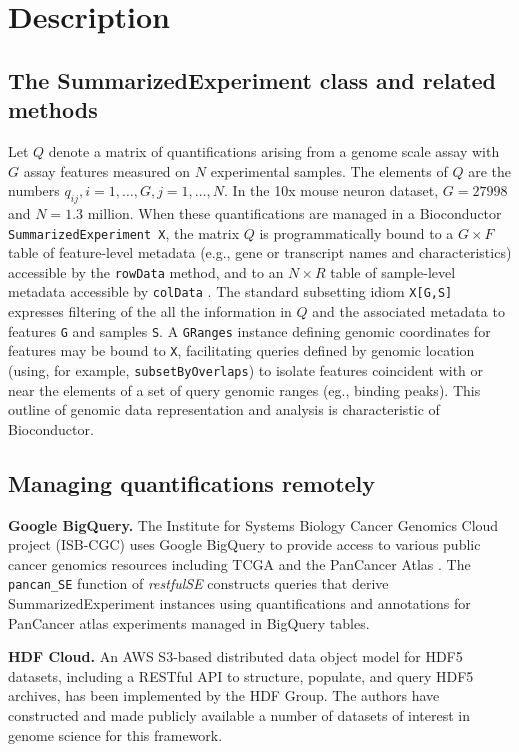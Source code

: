 \documentclass[applications]{gen-bioinformatics}
\newcommand{\Rpackage}[1]{{\textit{#1}}}
\begin{document}
\section*{Description}

\subsection*{The SummarizedExperiment class and related methods}

Let $Q$ denote a matrix of quantifications arising from a genome
scale assay with $G$ assay features measured on $N$ experimental
samples.  The elements of $Q$ are the numbers $q_{ij}, i = 1, \ldots, G,
j = 1, \ldots, N$.  In the 10x mouse neuron dataset, $G=27998$ and $N=1.3$ million.
When these quantifications are managed in a Bioconductor \verb+SummarizedExperiment X+, the matrix $Q$ is programmatically bound to a $G \times F$
table of feature-level metadata (e.g., gene or transcript names and
characteristics) accessible by the \verb+rowData+ method, and to an $N \times R$ table of sample-level metadata accessible by \verb+colData+ \citep{Huber2015}. 
The standard subsetting idiom \verb+X[G,S]+ expresses filtering of 
the all the information in $Q$ and the associated metadata
to features \verb+G+ and samples \verb+S+.  A \verb+GRanges+ 
instance \citep{Lawrence2013} defining genomic coordinates for features may be bound to \verb+X+,
facilitating queries defined by genomic location (using, for example, \verb+subsetByOverlaps+) to isolate features
coincident with or near the elements of a set of query genomic ranges (eg., binding peaks).  This outline of genomic data representation
and analysis is characteristic of Bioconductor.

\subsection*{Managing quantifications remotely}

\noindent
\textbf{Google BigQuery.} The Institute for Systems Biology Cancer
Genomics Cloud project (ISB-CGC) \citep{ISBCGC} uses 
Google BigQuery to provide access to
various public cancer genomics resources including
TCGA and the PanCancer Atlas \citep{Hoadley2018}.
The \verb+pancan_SE+
function of \Rpackage{restfulSE} constructs queries that derive
SummarizedExperiment instances using quantifications and annotations
for PanCancer atlas experiments
managed in BigQuery tables.  

\noindent
\textbf{HDF Cloud.}
An AWS S3-based distributed data object model for
HDF5 datasets, including a
RESTful API to structure, populate, and query HDF5 archives,  has been implemented by the HDF Group. The authors have constructed and
made publicly available a
number of datasets of interest in genome science for this framework.
\end{document}
